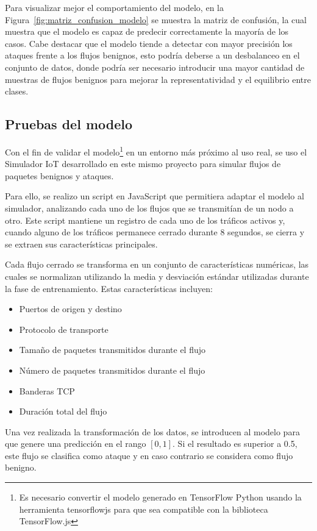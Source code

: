 Para visualizar mejor el comportamiento del modelo, en la Figura~\ref{fig:matriz_confusion_modelo} se muestra la matriz de confusión, la cual muestra que el modelo es capaz de predecir correctamente la mayoría de los casos. Cabe destacar que el modelo tiende a detectar con mayor precisión los ataques frente a los flujos benignos, esto podría deberse a un desbalanceo en el conjunto de datos, donde podría ser necesario introducir una mayor cantidad de muestras de flujos benignos para mejorar la representatividad y el equilibrio entre clases.

\subsection{Pruebas del modelo}
\label{subsec:PruebasModelo}
Con el fin de validar el modelo\footnote{Es necesario convertir el modelo generado en TensorFlow Python usando la herramienta tensorflowjs para que sea compatible con la biblioteca TensorFlow.js} en un entorno más próximo al uso real, se uso el Simulador IoT desarrollado en este mismo proyecto para simular flujos de paquetes benignos y ataques.

Para ello, se realizo un script en JavaScript que permitiera adaptar el modelo al simulador, analizando cada uno de los flujos que se transmitían de un nodo a otro. Este script mantiene un registro de cada uno de los tráficos activos y, cuando alguno de los tráficos permanece cerrado durante 8 segundos, se cierra y se extraen sus características principales.

Cada flujo cerrado se transforma en un conjunto de características numéricas, las cuales se normalizan utilizando la media y desviación estándar utilizadas durante la fase de entrenamiento. Estas características incluyen:
\begin{itemize}
    \item Puertos de origen y destino
    \item Protocolo de transporte
    \item Tamaño de paquetes transmitidos durante el flujo
    \item Número de paquetes transmitidos durante el flujo
    \item Banderas TCP
    \item Duración total del flujo
\end{itemize}
Una vez realizada la transformación de los datos, se introducen al modelo para que genere una predicción en el rango \([0, 1]\). Si el resultado es superior a 0.5, este flujo se clasifica como ataque y en caso contrario se considera como flujo benigno.

